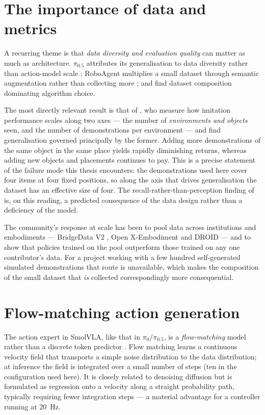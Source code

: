 \section{The importance of data and metrics}
\label{sec:bg-data}
A recurring theme is that \emph{data diversity and evaluation quality} can matter as
much as architecture. $\pi_{0.5}$ attributes its generalisation to data diversity rather
than action-model scale \parencite{black2025pi05}; RoboAgent multiplies a small dataset
through semantic augmentation rather than collecting more \parencite{bharadhwaj2024roboagent};
and \textcite{mandlekar2021robomimic} find dataset composition dominating algorithm
choice.

The most directly relevant result is that of \textcite{lin2025datascaling}, who measure
how imitation performance scales along two axes --- the number of \emph{environments and
objects} seen, and the number of demonstrations per environment --- and find
generalisation governed principally by the former. Adding more demonstrations of the
same object in the same place yields rapidly diminishing returns, whereas adding new
objects and placements continues to pay. This is a precise statement of the failure mode
this thesis encounters: the demonstrations used here cover four items at four fixed
positions, so along the axis that drives generalisation the dataset has an effective
size of four. The recall-rather-than-perception finding of 
is, on this reading, a predicted consequence of the data design rather than a deficiency
of the model.

The community's response at scale has been to pool data across institutions and
embodiments --- BridgeData V2 \parencite{walke2023bridgedata}, Open X-Embodiment
\parencite{padalkar2024openx} and DROID \parencite{khazatsky2024droid} --- and to show
that policies trained on the pool outperform those trained on any one contributor's
data. For a project working with a few hundred self-generated simulated demonstrations
that route is unavailable, which makes the composition of the small dataset that
\emph{is} collected correspondingly more consequential.

\section{Flow-matching action generation}
\label{sec:bg-flow}
The action expert in SmolVLA, like that in $\pi_{0}/\pi_{0.5}$, is a
\emph{flow-matching} model rather than a discrete token predictor
\parencite{black2024pi0, black2025pi05, shukor2025smolvla, zitkovich2023rt2}. Flow
matching \parencite{lipman2023flowmatching} learns a continuous velocity field that
transports a simple noise distribution to the data distribution; at inference the field
is integrated over a small number of steps (ten in the configuration used here). It is
closely related to denoising diffusion \parencite{chi2023diffusionpolicy} but is
formulated as regression onto a velocity along a straight probability path, typically
requiring fewer integration steps --- a material advantage for a controller running at
\SI{20}{Hz}.

